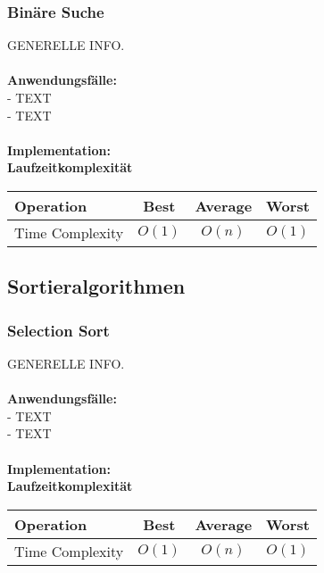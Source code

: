 \documentclass[../main.tex]{subfiles}
\begin{document}
	\subsubsection{Binäre Suche}
	GENERELLE INFO. \\\\
	\textbf{Anwendungsfälle:}\\
	- TEXT\\
	- TEXT\\\\
	\textbf{Implementation:}\\
	 
	\textbf{Laufzeitkomplexität}\\
	\begin{table}[ht]
		\centering
		\begin{tabular}{l *{3}{c}}
			\toprule
			Operation & Best & Average & Worst\\
			\midrule
			Time Complexity & $O(1)$ & $O(n)$ & $O(1)$\\
			\bottomrule
		\end{tabular}
	\end{table}
	\clearpage

	\subsection{Sortieralgorithmen}
	\subsubsection{Selection Sort}
	GENERELLE INFO. \\\\
	\textbf{Anwendungsfälle:}\\
	- TEXT\\
	- TEXT\\\\
	\textbf{Implementation:}\\
	 
	\textbf{Laufzeitkomplexität}\\
	\begin{table}[ht]
		\centering
		\begin{tabular}{l *{3}{c}}
			\toprule
			Operation & Best & Average & Worst\\
			\midrule
			Time Complexity & $O(1)$ & $O(n)$ & $O(1)$\\
			\bottomrule
		\end{tabular}
	\end{table}
	\clearpage
	
\end{document}
